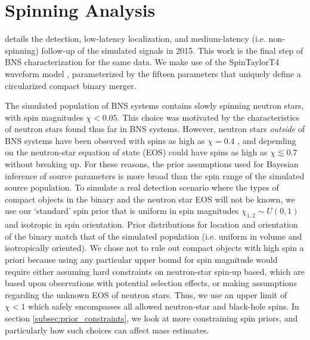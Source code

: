 \section{Spinning Analysis}
\label{sec:spin}

\citet{Singer_2014} details the detection, low-latency localization, and medium-latency (i.e. non-spinning) follow-up of the simulated signals in 2015. This work is the final step of BNS characterization for the same data. We make use of the SpinTaylorT4 waveform model \citep{Buonanno_2003,Buonanno_2009}, parameterized by the fifteen parameters that uniquely define a circularized compact binary merger.

The simulated population of BNS systems contains slowly spinning neutron stars, with spin magnitudes $\chi < 0.05$.  This choice was motivated by the characteristics of neutron stars found thus far in BNS systems. However, neutron stars \emph{outside} of BNS systems have been observed with spins as high as $\chi = 0.4$ \citep{Hessels_2006,Brown_2012}, and depending on the neutron-star equation of state (EOS) could have spins as high as $\chi \lesssim 0.7$ \citep{Lo_2011} without breaking up.  For these reasons, the prior assumptions used for Bayesian inference of source parameters is more broad than the spin range of the simulated source population.  To simulate a real detection scenario where the types of compact objects in the binary and the neutron star EOS will not be known, we use our `standard' spin prior that is uniform in spin magnitudes $\chi_{1,2} \sim U(0, 1)$ and isotropic in spin orientation. Prior distributions for location and orientation of the binary match that of the simulated population (i.e. uniform in volume and isotropically oriented).  We chose not to rule out compact objects with high spin a priori because using any particular upper bound for spin magnitude would require either assuming hard constraints on neutron-star spin-up based, which are based upon observations with potential selection effects, or making assumptions regarding the unknown EOS of neutron stars. Thus, we use an upper limit of $\chi < 1$ which safely encompasses all allowed neutron-star and black-hole spins.  In section \ref{subsec:prior_constraints}, we look at more constraining spin priors, and particularly how such choices can affect mass estimates.